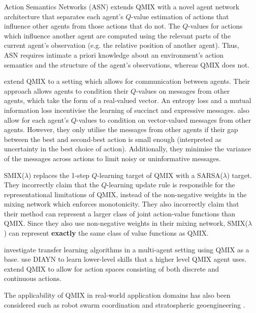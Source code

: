 \documentclass[twoside,11pt]{article}
\renewcommand{\cite}{\citep}
\begin{document}
Action Semantics Networks (ASN) \cite{wang_action_2019} extends QMIX with a novel agent network architecture that separates each agent's $Q$-value estimation of actions that influence other agents from those actions that do not.
The $Q$-values for actions which influence another agent are computed using the relevant parts of the current agent's observation (e.g. the relative position of another agent).
Thus, ASN requires 
intimate a priori knowledge about an environment's action semantics and the structure of the agent's observations, whereas QMIX does not.

\citet{wang_learning_2019} extend QMIX to a setting which allows for communication between agents.
Their approach allows agents to condition their $Q$-values on messages from other agents, which take the form of a real-valued vector. 
An entropy loss and a mutual information loss incentivise the learning of succinct and expressive messages.
\citet{zhang2019efficient} also allow for each agent's $Q$-values to condition on vector-valued messages from other agents. However, they only utilise the messages from other agents if their gap between the best and second-best action is small enough (interpreted as uncertainty in the best choice of action). Additionally, they minimise the variance of the messages across actions to limit noisy or uninformative messages.

SMIX($\lambda$) \cite{yao_smixlambda:_2019} replaces the 1-step $Q$-learning target of QMIX with a SARSA($\lambda$) target.
They incorrectly claim that the $Q$-learning update rule is responsible for the representational limitations of QMIX, instead of the non-negative weights in the mixing network which enforces monotonicity.
They also incorrectly claim that their method can represent a larger class of joint action-value functions than QMIX. 
Since they also use non-negative weights in their mixing network, SMIX($\lambda$) can represent \textbf{exactly} the same class of value functions as QMIX. 

\citet{liu2019value} investigate transfer learning algorithms in a multi-agent setting using QMIX as a base. \citet{yang2019hierarchical} use DIAYN \citep{eysenbach2018diversity} to learn lower-level skills that a higher level QMIX agent uses. \citet{fu2019deep} extend QMIX to allow for action spaces consisting of both discrete and continuous actions.

The applicability of QMIX in real-world application domains has also been considered such as robot swarm coordination \cite{huttenrauch_deep_2018} and stratospheric geoengineering \cite{de_witt_stratospheric_2019}. 
\end{document}
